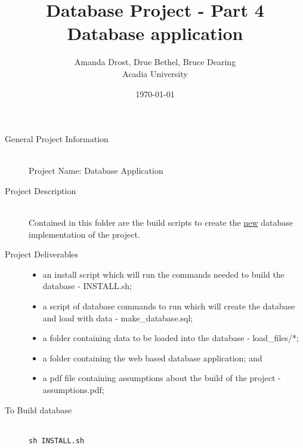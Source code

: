 \documentclass{article}
\begin{document}
\title{\huge{Database Project - Part 4 Database application}}
    \author{Amanda Drost, Drue Bethel, Bruce Dearing\\
    Acadia University}
\date{\today}
\maketitle
\clearpage

\begin{description}

    \item[General Project Information] \hfill \\
        Project Name: Database Application \\


    \item[Project Description] \hfill \\
        Contained in this folder are the build scripts to create the \underline{new} database implementation of the project.

    
    \item[Project Deliverables] \hfill 
        \begin{itemize}
            \item an install script which will run the commands needed to build the database - INSTALL.sh;
            \item a script of database commands to run which will create the database and load with data - make_database.sql;
            \item a folder containing data to be loaded into the database - load_files/*;
            \item a folder containing the web based database application; and
            \item a pdf file containing assumptions about the build of the project - assumptions.pdf;
        \end{itemize}
        
    \item[To Build database] \hfill \\
		\texttt{sh INSTALL.sh}

\end{description}
\end{document}
